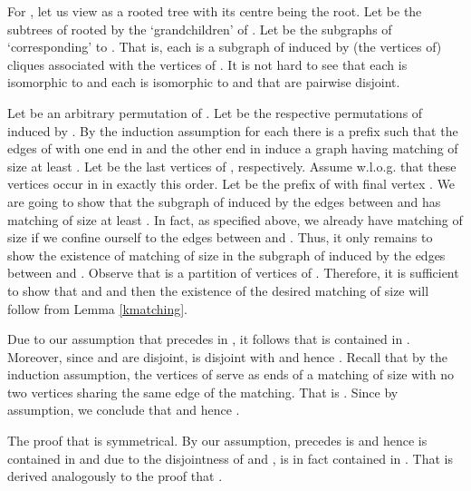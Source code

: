 \documentclass{article}
\begin{document}
For , let us view  as a rooted tree with its centre  being the 
root. Let  be the  subtrees of  rooted by the `grandchildren'
of . Let  be the subgraphs of  `corresponding' to
. That is, each  is a subgraph of  
induced by (the vertices of) cliques associated with the vertices
of . It is not hard to see that each  is isomorphic to  and each
 is isomorphic to  and that  are pairwise disjoint. 

\begin{comment}
Let us call  the -\emph{clique-tree} of .
Let , be the subgraphs of  that are 
 clique-trees of the subtrees of  rooted by the grandchildren 
of .
\end{comment}

\begin{comment}
In order to continue, we need the notion of \emph{induced permutation}. 
In particular, let  be a permutation of elements of a set 
and let . Then  induces a permutation  of 
where the elements of  are ordered exactly as they are ordered in .
\end{comment}

Let  be an arbitrary permutation of .
Let  be the respective permutations of 
induced by . By the induction assumption for each  there is a prefix
 such that the edges of  with one end in  and the other end in
 induce a graph having matching of size at least .
Let  be the last vertices of , respectively.
Assume w.l.o.g. that these vertices occur in  in exactly this order.
Let  be the prefix of  with final vertex . We are going to show that
the subgraph of  induced by the edges between  and 
has matching of size at least . In fact, as specified above, we already have 
matching of size  if we confine ourself to the edges between 
and . Thus, it only remains to show the existence of matching
of size  in the subgraph of  induced by the edges between
 and . 
Observe that  is a partition of vertices of .
Therefore, it is sufficient to show that  and  and then
the existence of the desired matching of size  will follow from Lemma \ref{kmatching}.

Due to our assumption that  precedes  in , it follows that  is contained in .
Moreover, since  and  are disjoint,  is disjoint with  and hence .
Recall that by the induction assumption, the vertices of  serve as ends
of a matching of size  with no two vertices sharing the same edge of the matching.
That is . Since  by assumption, we conclude that  and
hence .

The proof that  is symmetrical. By our assumption,  precedes  is  and
hence  is contained in  and due to the disjointness of  and
,  is in fact contained in . That 
is derived analogously to the proof that . 
\end{document}
